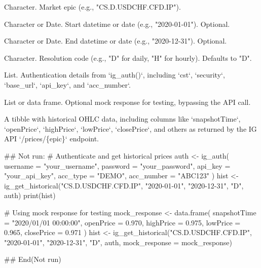 \documentclass[a4paper]{book}
\begin{document}
\begin{Arguments}
\begin{ldescription}
\item[\code{epic}] Character. Market epic (e.g., "CS.D.USDCHF.CFD.IP").

\item[\code{from}] Character or Date. Start datetime or date (e.g., "2020-01-01"). Optional.

\item[\code{to}] Character or Date. End datetime or date (e.g., "2020-12-31"). Optional.

\item[\code{resolution}] Character. Resolution code (e.g., "D" for daily, "H" for hourly). Defaults to "D".

\item[\code{auth}] List. Authentication details from `ig\_auth()`, including `cst`, `security`, `base\_url`, `api\_key`, and `acc\_number`.

\item[\code{mock\_response}] List or data frame. Optional mock response for testing, bypassing the API call.
\end{ldescription}
\end{Arguments}
%
\begin{Value}
A tibble with historical OHLC data, including columns like `snapshotTime`, `openPrice`, `highPrice`, `lowPrice`, `closePrice`, and others as returned by the IG API `/prices/\{epic\}` endpoint.
\end{Value}
%
\begin{Examples}
\begin{ExampleCode}
## Not run: 
# Authenticate and get historical prices
auth <- ig_auth(
  username = "your_username",
  password = "your_password",
  api_key = "your_api_key",
  acc_type = "DEMO",
  acc_number = "ABC123"
)
hist <- ig_get_historical("CS.D.USDCHF.CFD.IP", "2020-01-01", "2020-12-31", "D", auth)
print(hist)

# Using mock response for testing
mock_response <- data.frame(
  snapshotTime = "2020/01/01 00:00:00",
  openPrice = 0.970,
  highPrice = 0.975,
  lowPrice = 0.965,
  closePrice = 0.971
)
hist <- ig_get_historical("CS.D.USDCHF.CFD.IP", 
  "2020-01-01", 
  "2020-12-31",
  "D", 
  auth, 
  mock_response = mock_response)

## End(Not run)

\end{ExampleCode}
\end{Examples}
\end{document}
